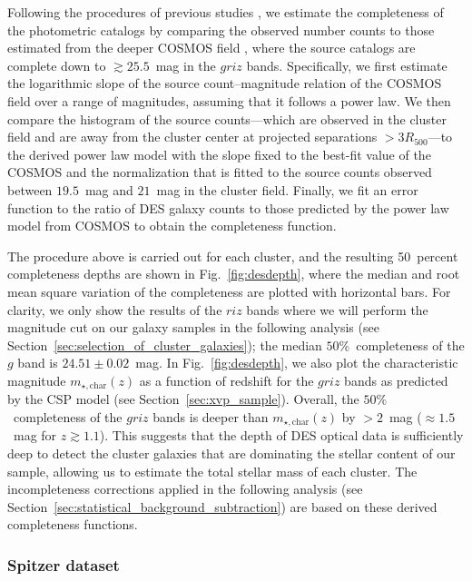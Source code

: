 \documentclass[useAMS,usenatbib,iop,numberedappendix]{mn2e}
\newcommand{\Rfiveoo}{\ensuremath{R_{500}}}
\newcommand{\redshift}{\ensuremath{z}}
\newcommand{\mstarchar}{\ensuremath{m_{\star, \mathrm{char}}}}
\newcommand{\percent}{\ensuremath{\%}}
\begin{document}
Following the procedures of previous studies \citep{zenteno11, chiu16b, hennig17}, we estimate the completeness of the photometric catalogs by comparing the observed number counts to those estimated from the deeper COSMOS field \citep{capak2007, ilbert2008, laigle16}, where the source catalogs are complete down to $\gtrsim25.5$~mag in the $griz$ bands. Specifically, we first estimate the logarithmic slope of the source count--magnitude relation of the COSMOS field over a range of magnitudes, assuming that it follows a power law.  We then compare the histogram of the source counts---which are observed in the cluster field and are away from the cluster center at projected separations $>3\Rfiveoo$---to the derived power law model with the slope fixed to the best-fit value of the COSMOS and the normalization that is fitted to the source counts observed between $19.5$~mag and $21$~mag in the cluster field.  Finally, we fit an error function to the ratio of DES galaxy counts to those predicted by the power law model from COSMOS to obtain the completeness function.


The procedure above is carried out for each cluster, and the resulting 50~percent completeness depths are shown in Fig.~\ref{fig:desdepth}, where the median and root mean square variation of the completeness are plotted with horizontal bars. For clarity, we only show the results of the $riz$ bands where we will perform the magnitude cut on our galaxy samples in the following analysis (see Section~\ref{sec:selection_of_cluster_galaxies}); the median $50$\percent\ completeness of the $g$ band is $24.51\pm0.02$~mag. 
In Fig.~\ref{fig:desdepth}, we also plot the characteristic magnitude $\mstarchar\left(\redshift\right)$ as a function of redshift for the $griz$ bands as predicted by the CSP model (see Section~\ref{sec:xvp_sample}). Overall, the $50$\percent\ completeness of the $griz$ bands is deeper than $\mstarchar\left(\redshift\right)$ by $>2$~mag ($\approx1.5$~mag for $\redshift\gtrsim1.1$).  This suggests that the depth of DES optical data is sufficiently deep to detect the cluster galaxies that are dominating the stellar content of our sample, allowing us to estimate the total stellar mass of each cluster. The incompleteness corrections applied in the following analysis (see Section~\ref{sec:statistical_background_subtraction}) are based on these derived completeness functions.

\subsubsection{Spitzer dataset}
\label{sec:spitzer_data_sets}
\end{document}
